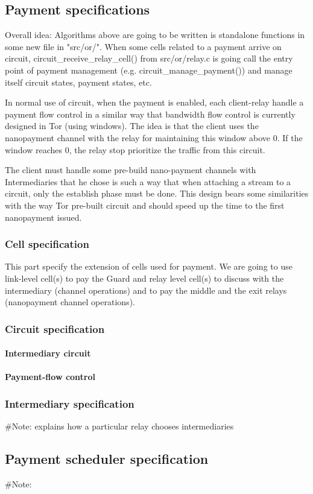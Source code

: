 \documentclass{article}
\begin{document}
\subsection{Payment specifications}
	\label{sec:payment_spec}
	
 Overall idea: Algorithms above are going to be written is standalone functions in some new file in "src/or/". When some cells related to a payment arrive on circuit, circuit\_receive\_relay\_cell() from src/or/relay.c is going call the entry point of payment management (e.g. circuit\_manage\_payment()) and manage itself circuit states, payment states, etc.

In normal use of circuit, when the payment is enabled, each client-relay handle a payment flow control in a similar way that bandwidth flow control is currently designed in Tor (using windows). The idea is that the client uses the nanopayment channel with the relay for maintaining this window above 0. If the window reaches 0, the relay stop prioritize the traffic from this circuit.

The client must handle some pre-build nano-payment channels with Intermediaries that he chose is such a way that when attaching a stream to a circuit, only the establish phase must be done. This design bears some similarities with the way Tor pre-built circuit and should speed up the time to the first nanopayment issued.
 \subsubsection{Cell specification}
 \label{sec:cell_spec}
 
 This part specify the extension of cells used for payment. We are going to use link-level cell(s) to pay the Guard and relay level cell(s) to discuss with the intermediary (channel operations) and to pay the middle and the exit relays (nanopayment channel operations). 
 
 \subsubsection{Circuit specification}
 
 	\paragraph*{Intermediary circuit}
 	
 	\paragraph*{Payment-flow control}
 	
 \subsubsection{Intermediary specification}
 	\#Note: explains how a particular relay chooses intermediaries
\subsection{Payment scheduler specification}
	\#Note: 
\end{document}
